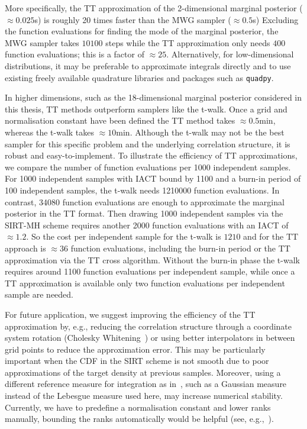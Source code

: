 More specifically, the TT approximation of the 2-dimensional marginal posterior ($\approx0.025$s) is roughly 20 times faster than the MWG sampler ($\approx0.5$s)
Excluding the function evaluations for finding the mode of the marginal posterior, the MWG sampler takes $10100$ steps while the TT approximation only needs $400$ function evaluations; this is a factor of $\approx25$.
Alternatively, for low-dimensional distributions, it may be preferable to approximate integrals directly and to use existing freely available quadrature libraries and packages such as \texttt{quadpy}.

In higher dimensions, such as the 18-dimensional marginal posterior considered in this thesis, TT methods outperform samplers like the t-walk.
Once a grid and normalisation constant have been defined the TT method takes $\approx0.5$min, whereas the t-walk takes $\approx 10$min.
Although the t-walk may not be the best sampler for this specific problem and the underlying correlation structure, it is robust and easy-to-implement.
To illustrate the efficiency of TT approximations, we compare the number of function evaluations per 1000 independent samples.
For 1000 independent samples with IACT bound by 1100 and a burn-in period of 100 independent samples, the t-walk needs 1210000 function evaluations. 
In contrast, 34080 function evaluations are enough to approximate the marginal posterior in the TT format.
Then drawing 1000 independent samples via the SIRT-MH scheme requires another 2000 function evaluations with an IACT of $\approx 1.2$.
So the cost per independent sample for the t-walk is $1210$ and for the TT approach is $\approx 36$ function evaluations, including the burn-in period or the TT approximation via the TT cross algorithm.
Without the burn-in phase the t-walk requires around 1100 function evaluations per independent sample, while once a TT approximation is available only two function evaluations per independent sample are needed.

For future application, we suggest improving the efficiency of the TT approximation by, e.g., reducing the correlation structure through a coordinate system rotation (Cholesky Whitening~\cite{KessyWhitening2018}) or using better interpolators in between grid points to reduce the approximation error.
This may be particularly important when the CDF in the SIRT scheme is not smooth due to poor approximations of the target density at previous samples.  
Moreover, using a different reference measure for integration as in~\cite{cui2022deep}, such as a Gaussian measure instead of the Lebesgue measure used here, may increase numerical stability.
Currently, we have to predefine a normalisation constant and lower ranks manually, bounding the ranks automatically would be helpful (see, e.g.,~\cite{Rohrbach2022tterror}).



